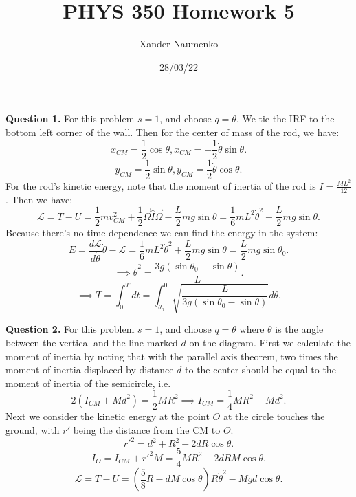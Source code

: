 \documentclass[letterpaper, reqno,11pt]{article}
\begin{document}
\title{PHYS 350 Homework 5}
\date{28/03/22}
\author{Xander Naumenko}
\maketitle

{\noindent\bf Question 1.} For this problem $s=1$, and choose $q=\theta$. We tie the IRF to the bottom left corner of the wall. Then for the center of mass of the rod, we have: 
\[
x_{CM}=\frac{1}{2}\cos\theta, \dot x_{CM}=-\frac{1}{2}\dot\theta\sin\theta
.\]
\[
y_{CM}=\frac{1}{2}\sin\theta, \dot y_{CM}=\frac{1}{2}\dot\theta\cos\theta
.\]
For the rod's kinetic energy, note that the moment of inertia of the rod is $I=\frac{ML^2}{12}$. Then we have: 
\[
\mathcal L=T-U=\frac{1}{2}mv_{CM}^2+\frac{1}{2}\vec\Omega \hat{I}\vec\Omega-\frac{L}{2}mg\sin\theta=\frac{1}{6}mL^2\dot\theta^2-\frac{L}{2}mg\sin\theta
.\]
Because there's no time dependence we can find the energy in the system: 
\[
E=\frac{d\mathcal L}{d\dot\theta}\dot \theta-\mathcal L=\frac{1}{6}mL^2\dot\theta^2+\frac{L}{2}mg\sin\theta=\frac{L}{2}mg\sin\theta_0
.\]
\[
\implies \dot\theta^2=\frac{3g(\sin\theta_0-\sin\theta)}{L}
.\]
\[
\implies T=\int_0^T dt=\int_{\theta_0}^0 \sqrt{\frac{L}{3g(\sin\theta_0-\sin\theta)}}d\theta
.\]

{\noindent\bf Question 2.} For this problem $s=1$, and choose $ q=\theta$ where $\theta$ is the angle between the vertical and the line marked $d$ on the diagram. First we calculate the moment of inertia by noting that with the parallel axis theorem, two times the moment of inertia displaced by distance $d$ to the center should be equal to the moment of inertia of the semicircle, i.e.
\[
2(I_{CM}+Md^2)=\frac{1}{2}MR^2\implies I_{CM}=\frac{1}{4}MR^2-Md^2
.\]
Next we consider the kinetic energy at the point $O$ at the circle touches the ground, with $r'$ being the distance from the CM to $O$. 
\[
r'^2=d^2+R^2-2dR\cos\theta
.\]
\[
I_O=I_{CM}+r'^2M=\frac{5}{4}MR^2-2dRM\cos\theta
.\]
\[
\mathcal L=T-U=\left( \frac{5}{8}R-dM\cos\theta \right) R\dot\theta^2-Mgd\cos\theta
.\]
\end{document}
